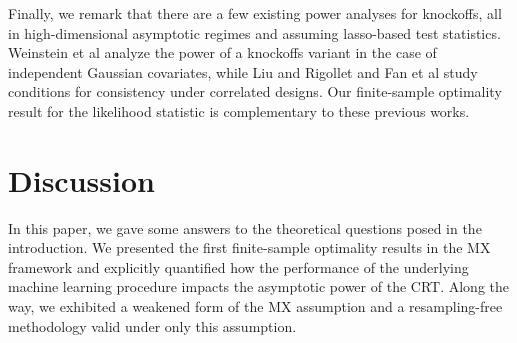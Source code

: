 \documentclass[12pt]{article}
\theoremstyle{definition}
\theoremstyle{remark}
\newcommand{\srx}{X}
\newcommand{\srz}{Z}
\newcommand{\srxk}{\widetilde X}
\newcommand{\sry}{Y}
\begin{document}
Finally, we remark that there are a few existing power analyses for knockoffs, all in high-dimensional asymptotic regimes and assuming lasso-based test statistics. Weinstein et al \cite{Weinstein2017} analyze the power of a knockoffs variant in the case of independent Gaussian covariates, while Liu and Rigollet \cite{Liu2019} and Fan et al \cite{Fan2020} study conditions for consistency under correlated designs. Our finite-sample optimality result for the likelihood statistic is complementary to these previous works.




\section{Discussion}
\label{sec:discussion}

In this paper, we gave some answers to the theoretical questions posed in the introduction. We presented the first finite-sample optimality results in the MX framework and explicitly quantified how the performance of the underlying machine learning procedure impacts the asymptotic power of the CRT. Along the way, we exhibited a weakened form of the MX assumption and a resampling-free methodology valid under only this assumption.
\end{document}
